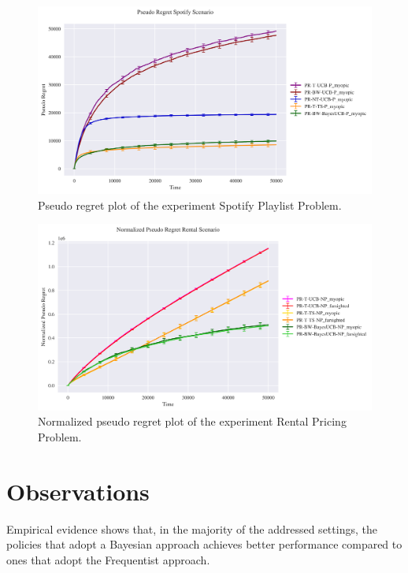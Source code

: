 
\begin{figure}[H]
		\includegraphics[width=16cm]{./images/ANALYTICS/experiment_spotify_def ANALYTICS.png}
		\centering	
		\caption{Pseudo regret plot of the experiment Spotify Playlist Problem.}
		\label{f:s}
\end{figure}




\begin{figure}[H]
	\centering
	\includegraphics[width=16cm]{./images/ANALYTICS/affitti-def ANALYTICS.png}
		
	\caption{Normalized pseudo regret plot of the experiment Rental Pricing Problem.}
	\label{f:r}
\end{figure}




\section{Observations}
Empirical evidence shows that, in the majority of the addressed settings, the policies that adopt a Bayesian approach achieves better performance compared to ones that adopt the Frequentist approach.

